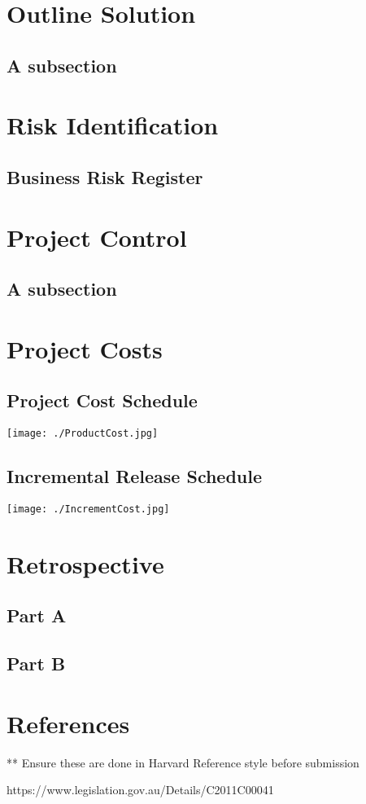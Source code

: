 \documentclass[11pt]{article} %
\begin{document}
\section{Outline Solution}
\subsection{A subsection}

\section{Risk Identification}
\subsection{Business Risk Register}

\section{Project Control}
\subsection{A subsection}

\newpage
\section{Project Costs}

\subsection{Project Cost Schedule}
\begin{center}
\texttt{[image: ./ProductCost.jpg]}
\end{center}
\newpage
\subsection{Incremental Release Schedule}
\begin{center}
\texttt{[image: ./IncrementCost.jpg]}
\end{center}
\newpage


\section{Retrospective}
\subsection{Part A}
\subsection{Part B}

\newpage
\section{References}

** Ensure these are done in Harvard Reference style before submission

https://www.legislation.gov.au/Details/C2011C00041
\end{document}
